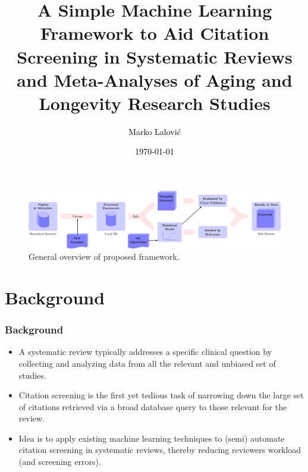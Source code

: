 \documentclass[10pt, xcolor={dvipsnames}]{beamer}
\title[Longevity Research Screening]{A Simple Machine Learning Framework to Aid Citation Screening in Systematic Reviews and Meta-Analyses of Aging and Longevity Research Studies}
\author[\textcolor{white}{Marko Lalović}]{\textcolor{black}{Marko Lalović}}
\date[\textcolor{white}{\today}]{\textcolor{black}{\today}}
\begin{document}
\begin{frame}
\begin{center}
\maketitle
\begin{figure}
    \includegraphics[width=\linewidth]{../report/diagrams/general-overview/general-overview-crop.pdf}
    \caption{General overview of proposed framework.}
\end{figure}    
\end{center}
\end{frame}



\section{Background}
\begin{frame}
\frametitle{Background}
\begin{itemize}
\item A systematic review typically addresses a specific clinical question by collecting and analyzing data from all the relevant and unbiased set of studies. 
\item Citation screening is the first yet tedious task of narrowing down the large set of citations retrieved via a broad database query to those relevant for the review.
\item Idea is to apply existing machine learning techniques to (semi) automate citation screening in systematic reviews, thereby reducing reviewers workload (and screening errors).
\end{itemize}
\end{frame}
\end{document}
